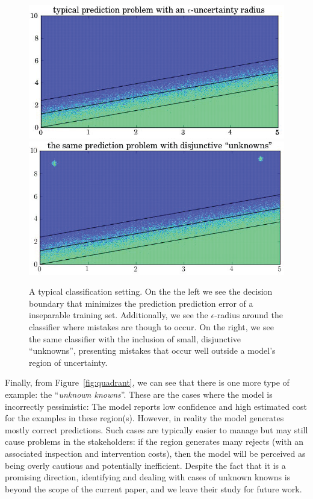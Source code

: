 \begin{figure}[t]

\begin{center}
\includegraphics[width=0.49\columnwidth]{plots/example_function_2a.png}
\includegraphics[width=0.49\columnwidth]{plots/example_function_2b.png}
\end{center}
\caption{A typical classification setting. On the the left we see the decision boundary that minimizes the prediction prediction error of a inseparable training set. Additionally, we see the $\epsilon$-radius around the classifier where mistakes are though to occur. On the right, we see the same classifier with the inclusion of small, disjunctive ``unknowns'', presenting mistakes that occur well outside a model's region of uncertainty. }
\label{fig:unknown}
\end{figure}

Finally, from Figure~\ref{fig:quadrant}, we can see that there is one more type of example: the ``\emph{unknown knowns}''. These are the cases where the model is incorrectly pessimistic: The model reports low confidence and high estimated cost for the examples in these region(s). However, in reality the model generates mostly correct predictions. Such cases are typically easier to manage but may still cause problems in the stakeholders: if the region generates many rejects (with an associated inspection and intervention costs), then the model will be perceived as being overly cautious and potentially inefficient. Despite the fact that it is a promising direction, identifying and dealing with cases of unknown knowns is beyond the scope of the current paper, and we leave their study for future work.